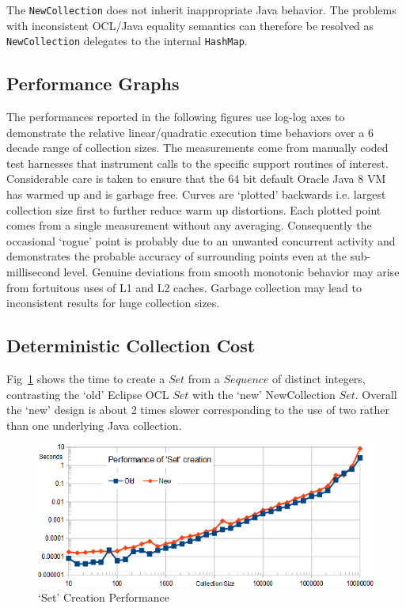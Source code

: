 \documentclass{llncs}
\begin{document}
The \verb$NewCollection$ does not inherit inappropriate Java behavior. The problems with inconsistent OCL/Java equality semantics can therefore be resolved as \verb$NewCollection$ delegates to the internal \verb$HashMap$.

\subsection{Performance Graphs}

The performances reported in the following figures use log-log axes to demonstrate the relative linear/quadratic execution time behaviors over a 6 decade range of collection sizes. The measurements come from manually coded test harnesses that instrument calls to the specific support routines of interest. Considerable care is taken to ensure that the 64 bit default Oracle Java 8 VM has warmed up and is garbage free. Curves are `plotted' backwards i.e. largest collection size first to further reduce warm up distortions. Each plotted point comes from a single measurement without any averaging. Consequently the occasional `rogue' point is probably due to an unwanted concurrent activity and demonstrates the probable accuracy of surrounding points even at the sub-millisecond level. Genuine deviations from smooth monotonic behavior may arise from fortuitous uses of L1 and L2 caches. Garbage collection may lead to inconsistent results for huge collection sizes. 

\subsection{Deterministic Collection Cost}

Fig~\ref{fig:SetCreatePerformance} shows the time to create a $Set$ from a $Sequence$ of distinct integers, contrasting the `old' Eclipse OCL $Set$ with the `new' NewCollection $Set$. Overall the `new' design is about 2 times slower corresponding to the use of two rather than one underlying Java collection.

\begin{figure}
	\begin{center}
		\includegraphics[width=4.5in]{SetCreatePerformance.png}
	\end{center}
	\caption{`Set' Creation Performance}
	\label{fig:SetCreatePerformance}
\end{figure}
\end{document}
